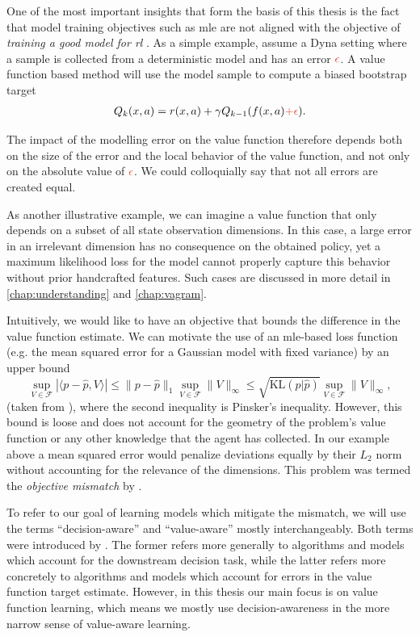 One of the most important insights that form the basis of this thesis is the fact that model training objectives such as \ac{mle} are not aligned with the objective of \emph{training a good model for \ac{rl}} \parencite{schneider1997exploiting,joseph2013reinforcement,vaml,lambert202objective}.
As a simple example, assume a Dyna setting where a sample is collected from a deterministic model and has an error ${\color{uoftred}\epsilon}$.
A value function based method will use the model sample to compute a biased bootstrap target
\begin{align}
    Q_k(\state,a) = r(\state,a) + \gamma Q_{k-1}(f(\state, a) {\color{uoftred} + \epsilon}).
\end{align}

The impact of the modelling error on the value function therefore depends both on the size of the error and the local behavior of the value function, and not only on the absolute value of ${\color{uoftred}\epsilon}$. 
We could colloquially say that not all errors are created equal.

As another illustrative example, we can imagine a value function that only depends on a subset of all state observation dimensions. 
In this case, a large error in an irrelevant dimension has no consequence on the obtained policy, yet a maximum likelihood loss for the model cannot properly capture this behavior without prior handcrafted features.
Such cases are discussed in more detail in \autoref{chap:understanding} and \autoref{chap:vagram}.

Intuitively, we would like to have an objective that bounds the difference in the value function estimate.
We can motivate the use of an \ac{mle}-based loss function (e.g. the mean squared error for a Gaussian model with fixed variance) {by an upper bound}
$$\sup_{V \in \mathcal{F}}|\langle p - \hat{p}, V\rangle|\leq \|p - \hat{p}\|_1 \sup_{V \in \mathcal{F}}\|V\|_\infty \leq \sqrt{\text{KL}(p|\hat{p})}\sup_{V \in \mathcal{F}}\|V\|_\infty,$$
(taken from
\textcite{vaml}), where the second inequality is Pinsker's inequality.
However, this bound is loose and does not account for the geometry of the problem's value function or any other knowledge that the agent has collected. 
In our example above a mean squared error would penalize deviations equally by their $L_2$ norm without accounting for the relevance of the dimensions.
This problem was termed the \emph{objective mismatch} by \textcite{lambert202objective}.

To refer to our goal of learning models which mitigate the mismatch, we will use the terms ``decision-aware'' and ``value-aware'' mostly interchangeably.
Both terms were introduced by \textcite{vaml}.
The former refers more generally to algorithms and models which account for the downstream decision task, while the latter refers more concretely to algorithms and models which account for errors in the value function target estimate.
However, in this thesis our main focus is on value function learning, which means we mostly use decision-awareness in the more narrow sense of value-aware learning.

